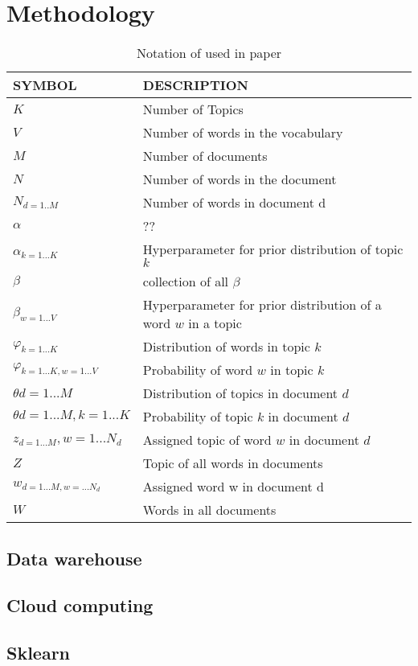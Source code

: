 \chapter{Methodology}  \label{ch:methodology}

\begin{table}[h]
\centering
 \begin{tabular}{l l} 
 \hline
 SYMBOL & DESCRIPTION \\ 
 \hline
 $K$ & Number of Topics \\  
 $V$ & Number of words in the vocabulary \\
 $M$ & Number of documents \\
 $N$ & Number of words in the document \\
 $N_{d=1..M}$ & Number of words in document d\\
 $\alpha$ & ?? \\
 $\alpha_{k=1...K}$ & Hyperparameter for prior distribution of topic $k$ \\
 $\beta$ & collection of all $\beta$ \\
 $\beta_{w=1...V}$ & Hyperparameter for prior distribution of a word $w$ in a topic \\
 $\varphi_{k=1...K}$ & Distribution of words in topic $k$ \\
 $\varphi_{k=1...K, w=1...V}$ & Probability of  word $w$ in topic $k$  \\
 $\theta{d=1...M}$ & Distribution of topics in document $d$  \\
 $\theta{d=1...M, k=1...K}$ & Probability of  topic $k$ in document $d$ \\
 $z_{d=1...M}, w=1...N_d$ & Assigned topic of word $w$ in document $d$\\
 $Z$ & Topic of all words in documents \\
 $w_{d=1...M, w=...N_d}$ & Assigned word w in document d \\ 
 $W$ & Words in all documents \\ 

 

 
 \hline
 \end{tabular}
\caption{Notation of used in paper}
\label{tab:table1}
\end{table}

\section{Data warehouse}
\section{Cloud computing}
\section{Sklearn}
